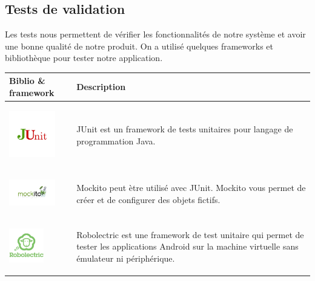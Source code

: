 \subsection{Tests de validation}

Les tests nous permettent de v\'erifier les fonctionnalit\'es de notre syst\`eme et avoir une bonne qualit\'e de notre produit. On a utilis\'e quelques frameworks et biblioth\`eque pour tester notre application.

\begin{table}[H]
\begin{center}
\begin{tabularx}{\textwidth}{ |p{3.5cm}|X| }
\hline Biblio \& framework & Description \\ \hline \hline

\begin{center}
\includegraphics[width=2cm]{Figures/junit.jpg} 
\end{center}
& 
\begin{center}
JUnit est un framework de tests unitaires pour langage de programmation Java.
\end{center}
\\ \hline

\begin{center}
\includegraphics[width=2cm]{Figures/mockito.png} 
\end{center}
& 
\begin{center}
Mockito peut \`etre utilis\'e avec JUnit. Mockito vous permet de cr\'eer et de configurer des objets fictifs.
\end{center}
\\ \hline

\begin{center}
\includegraphics[width=1.5cm]{Figures/robolectric.png} 
\end{center}
& 
\begin{center}
Robolectric est une framework de test unitaire qui permet de tester les applications Android sur la machine virtuelle sans \'emulateur ni p\'eriph\'erique.
\end{center}
\\ \hline


\end{tabularx}
\end{center}
\end{table}
